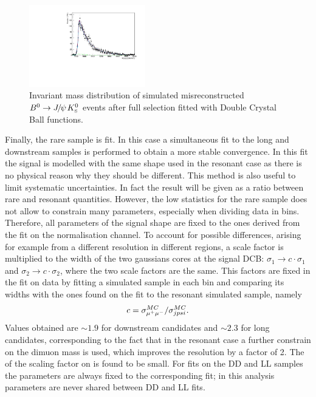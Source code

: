 \begin{figure}
\centering
\includegraphics[width=0.45\textwidth]{Lmumu/figs/MassFits/fitKS_bkg.pdf}
\caption{Invariant mass distribution of simulated misreconstructed $\Bz\ra\jpsi\KS$ events after full selection fitted with Double Crystal Ball functions. }
\label{fig:KSbkgFit}
\end{figure}

Finally, the rare \Lb\to\Lz\mumu sample is fit. In this case a simultaneous fit to the long
and downstream samples is performed to obtain a more stable convergence. 
In this fit the signal is modelled with the same shape used in the resonant case as there is no physical
reason why they should be different. This method is also useful to limit systematic uncertainties.
In fact the result will be given as a ratio between rare and resonant quantities.
However, the low statistics for the rare sample does not allow to constrain many parameters,
especially when dividing data in \qsq bins. Therefore, all parameters of the signal shape are fixed to
the ones derived from the fit on the normalisation channel. To account for possible differences, arising
for example from a different resolution in different \qsq regions, a scale factor is multiplied
to the width of the two gaussians cores at the signal DCB: $\sigma_1 \rightarrow c\cdot \sigma_1$
and $\sigma_2 \rightarrow c\cdot \sigma_2$, where the two scale factors are the same. This factors
are fixed in the fit on data by fitting a \Lz\mumu simulated sample in each \qsq bin and comparing
its widths with the ones found on the fit to the resonant simulated sample, namely
\begin{equation}
c = \sigma_{\mu^+\mu^-}^{MC} / \sigma_{jpsi}^{MC}.
\end{equation}
Values obtained are $\sim 1.9$ for downstream candidates and $\sim 2.3$ for long candidates,
corresponding to the fact that in the resonant case a further constrain on the dimuon mass
is used, which improves the resolution by a factor of 2. The of the scaling factor on \qsq is found to be small.
For fits on the DD and LL samples the parameters are always fixed to the corresponding \jpsi fit;
in this analysis parameters are never shared between DD and LL fits.


